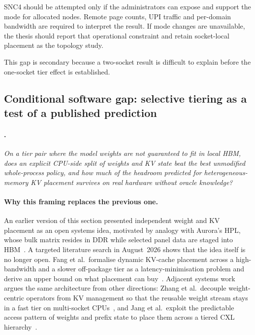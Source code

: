 SNC4 should be attempted only if the administrators can expose and
support the mode for allocated nodes.  Remote page counts, UPI traffic
and per-domain bandwidth are required to interpret the result.  If
mode changes are unavailable, the thesis should report that operational
constraint and retain socket-local placement as the topology study.

This gap is secondary because a two-socket result is difficult to
explain before the one-socket tier effect is established.

\subsection{Conditional software gap: selective tiering as a test of a
published prediction}
\label{sec:gap-software}

\paragraph{.}
\emph{On a tier pair where the model weights are not guaranteed to fit
in local HBM, does an explicit CPU-side split of weights and KV state
beat the best unmodified whole-process policy, and how much of the
headroom predicted for heterogeneous-memory KV placement survives on
real hardware without oracle knowledge?}

\paragraph{Why this framing replaces the previous one.}
An earlier version of this section presented independent weight and KV
placement as an open systems idea, motivated by analogy with Aurora's
HPL, whose bulk matrix resides in DDR while selected panel data are
staged into HBM~\cite{goto2026aurorahpl}.  A targeted literature search
in August~2026 shows that the idea itself is no longer open.  Fang et
al.\ formalise dynamic KV-cache placement across a high-bandwidth and a
slower off-package tier as a latency-minimisation problem and derive an
upper bound on what placement can buy~\cite{fang2025kvplacement}.
Adjacent systems work argues the same architecture from other
directions: Zhang et al.\ decouple weight-centric operators from KV
management so that the reusable weight stream stays in a fast tier on
multi-socket CPUs~\cite{zhang2026cacheresident}, and Jang et al.\
exploit the predictable access pattern of weights and prefix state to
place them across a tiered CXL hierarchy~\cite{jang2026itme}.

